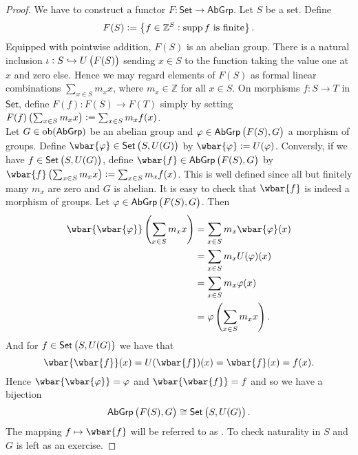 \begin{proof}
	We have to construct a functor $F : \mathsf{Set} \to \mathsf{AbGrp}$. Let $S$ be a set. Define 
	\begin{equation*}
		F(S) := \cbr[1]{f \in \mathbb{Z}^S : \supp f \text{ is finite}}.
	\end{equation*}
	Equipped with pointwise addition, $F(S)$ is an abelian group. There is a natural inclusion $\iota : S \hookrightarrow U\del[1]{F(S)}$ sending $x \in S$ to the function taking the value one at $x$ and zero else. Hence we may regard elements of $F(S)$ as formal linear combinations $\sum_{x \in S}m_x x$, where $m_x \in \mathbb{Z}$ for all $x \in S$. On morphisms $f : S \to T$ in $\mathsf{Set}$, define $F(f) : F(S) \to F(T)$ simply by setting $F(f)\del[1]{\sum_{x \in S}m_x x} := \sum_{x \in S}m_x f(x)$.\\	
	Let $G \in \operatorname{ob}(\mathsf{AbGrp})$ be an abelian group and $\varphi \in \mathsf{AbGrp}\del[1]{F(S), G}$ a morphism of groups. Define $\wbar{\varphi} \in \mathsf{Set}\del[1]{S,U(G)}$ by $\wbar{\varphi} := U(\varphi)$. Conversly, if we have $f \in \mathsf{Set}\del[1]{S,U(G)}$, define $\wbar{f} \in \mathsf{AbGrp}\del[1]{F(S),G}$ by $\wbar{f}\del[1]{\sum_{x \in S} m_x x} := \sum_{x \in S} m_x f(x)$. This is well defined since all but finitely many $m_x$ are zero and $G$ is abelian. It is easy to check that $\wbar{f}$ is indeed a morphism of groups. Let $\varphi \in \mathsf{AbGrp}\del[1]{F(S),G}$. Then
	\begin{align*}
		\wbar{\wbar{\varphi}}\del[4]{\sum_{x \in S} m_x x} &= \sum_{x \in S}m_x \wbar{\varphi}(x)\\
		&= \sum_{x \in S} m_x U(\varphi)(x)\\
		&= \sum_{x \in S} m_x \varphi(x)\\
		&= \varphi \del[4]{\sum_{x \in S} m_x x}.
	\end{align*}
	And for $f \in \mathsf{Set}\del[1]{S,U(G)}$ we have that
	\begin{equation*}
		\wbar{\wbar{f}}(x) = U(\wbar{f})(x) = \wbar{f}(x) = f(x). 
	\end{equation*}
	\noindent Hence $\wbar{\wbar{\varphi}} = \varphi$ and $\wbar{\wbar{f}} = f$ and so we have a bijection
	\begin{equation*}
		\mathsf{AbGrp}\del[1]{F(S),G} \cong \mathsf{Set}\del[1]{S,U(G)}.
	\end{equation*}
	The mapping $f \mapsto \wbar{f}$ will be referred to as . To check naturality in $S$ and $G$ is left as an exercise.
\end{proof}

